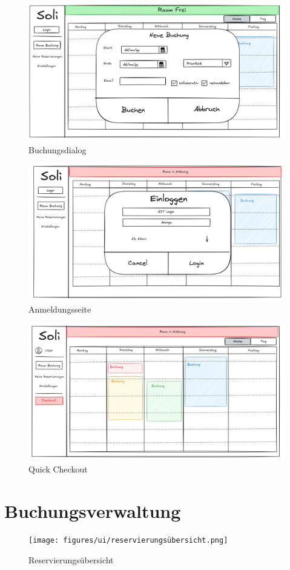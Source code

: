 \begin{figure}[ht]
    \centering
    \includegraphics[scale=0.15]{figures/ui/buchungsdialog.png}
    \caption{Buchungsdialog}
    \label{fig:buchung}
\end{figure}

\begin{figure}[ht]
    \centering
    \includegraphics[scale=0.15]{figures/ui/anmeldungsseite.png}
    \caption{Anmeldungsseite}
    \label{fig:login}
\end{figure}

\begin{figure}[ht]
    \centering
    \includegraphics[scale=0.15]{figures/ui/checkout.png}
    \caption{Quick Checkout}
    \label{fig:checkout}
\end{figure}
\clearpage
\section{Buchungsverwaltung}

\begin{figure}[ht]
    \centering
    \texttt{[image: figures/ui/reservierungsübersicht.png]}
    \caption{Reservierungsübersicht}
    \label{fig:overview}
\end{figure}
